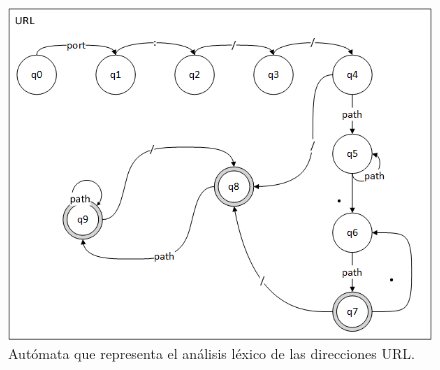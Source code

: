 \documentclass[a4paper,12pt]{article}
\begin{document}
\begin{figure}[h]
  \includegraphics[width=\linewidth]{url.png}
  \caption{Autómata que representa el análisis léxico de las direcciones URL.}
  \label{fig:auto4}
\end{figure}
\end{document}

